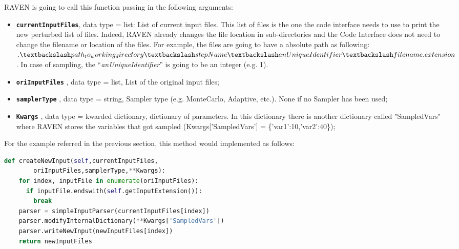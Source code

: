 RAVEN is going to call this function passing in the following arguments:
\begin{itemize}
  \item \textbf{\texttt{currentInputFiles}}, data type = list: List of current
              input files. This list of files is the one the code interface needs to use to print the new perturbed list of files.
              Indeed, RAVEN already changes the file location in sub-directories and the Code Interface does not need to
              change the filename or location of the files. For example, the files are going to have a absolute path as following:
              $.\textbackslash path_to_working_directory\textbackslash stepName\textbackslash anUniqueIdentifier\textbackslash filename.extension$. In case of sampling, the 
              ``\textit{anUniqueIdentifier}'' is going to be an integer (e.g. 1).
  \item \textbf{\texttt{oriInputFiles}} , data type = list, List of the original input files;
  \item  \textbf{\texttt{samplerType}} , data type = string, Sampler type (e.g. MonteCarlo,
               Adaptive, etc.). \nb None if no Sampler has been used;
  \item  \textbf{\texttt{Kwargs}} , data type = kwarded dictionary, dictionary of parameters.
               In this dictionary there is another dictionary
               called "SampledVars" where RAVEN stores the
               variables that got sampled
               (Kwargs['SampledVars'] = \{'var1':10,'var2':40\});
\end{itemize}
For the example referred in the previous section, this method would implemented as follows:
\newline
\begin{lstlisting}[language=python]
  def createNewInput(self,currentInputFiles,
        oriInputFiles,samplerType,**Kwargs):
    for index, inputFile in enumerate(oriInputFiles):
      if inputFile.endswith(self.getInputExtension()):
        break
    parser = simpleInputParser(currentInputFiles[index])
    parser.modifyInternalDictionary(**Kwargs['SampledVars'])
    parser.writeNewInput(newInputFiles[index])
    return newInputFiles
\end{lstlisting}



